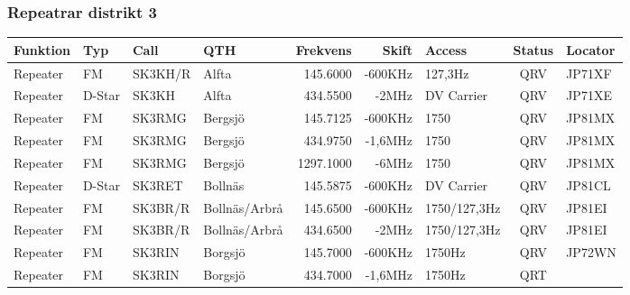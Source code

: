 \begin{landscape}
\subsubsection{Repeatrar distrikt 3}
\footnotesize
\begin{longtable}{llllrrlcl}
	\textbf{Funktion}         & \textbf{Typ}  & \textbf{Call} & \textbf{QTH}        & \textbf{Frekvens} & \textbf{Skift} & \textbf{Access}  & \textbf{Status} & \textbf{Locator} \\ \hline
	\endhead
	Repeater                  & FM            & SK3KH/R       & Alfta               & 145.6000          & -600KHz        & 127,3Hz          & QRV             & JP71XF           \\
	Repeater                  & D-Star        & SK3KH         & Alfta               & 434.5500          & -2MHz          & DV Carrier       & QRV             & JP71XE           \\
	Repeater                  & FM            & SK3RMG        & Bergsjö             & 145.7125          & -600KHz        & 1750             & QRV             & JP81MX           \\
	Repeater                  & FM            & SK3RMG        & Bergsjö             & 434.9750          & -1,6MHz        & 1750             & QRV             & JP81MX           \\
	Repeater                  & FM            & SK3RMG        & Bergsjö             & 1297.1000         & -6MHz          & 1750             & QRV             & JP81MX           \\
	Repeater                  & D-Star        & SK3RET        & Bollnäs             & 145.5875          & -600KHz        & DV Carrier       & QRV             & JP81CL           \\
	Repeater                  & FM            & SK3BR/R       & Bollnäs/Arbrå       & 145.6500          & -600KHz        & 1750/127,3Hz     & QRV             & JP81EI           \\
	Repeater                  & FM            & SK3BR/R       & Bollnäs/Arbrå       & 434.6500          & -2MHz          & 1750/127,3Hz     & QRV             & JP81EI           \\
	Repeater                  & FM            & SK3RIN        & Borgsjö             & 145.7000          & -600KHz        & 1750Hz           & QRV             & JP72WN           \\
	Repeater                  & FM            & SK3RIN        & Borgsjö             & 434.7000          & -1,6MHz        & 1750Hz           & QRT             & \\

\end{longtable}
\end{landscape}
